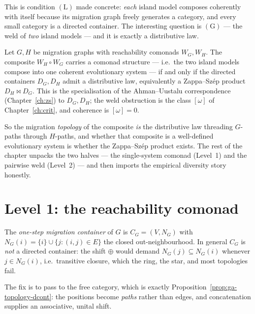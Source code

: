 This is condition $(\mathrm{L})$ made concrete: \emph{each} island model
composes coherently with itself because its migration graph freely generates a
category, and every small category is a directed container. The interesting
question is $(\mathrm{G})$ --- the weld of \emph{two} island models --- and it
is exactly a distributive law.

\begin{theorem}[Coherence $=$ Zappa--Sz\'ep existence; \emph{proved}]
\label{thm:ga-headline}
Let $G,H$ be migration graphs with reachability comonads $W_G,W_H$. The
composite $W_H\circ W_G$ carries a comonad structure --- i.e.\ the two island
models compose into one coherent evolutionary system --- if and only if the
directed containers $D_G,D_H$ admit a distributive law, equivalently a
Zappa--Sz\'ep product $D_H\bowtie D_G$. This is the specialisation of the
Ahman--Uustalu correspondence (Chapter~\ref{ch:zs}) to $D_G,D_H$; the weld
obstruction is the class $[\omega]$ of Chapter~\ref{ch:crit}, and coherence is
$[\omega]=0$.
\end{theorem}

So the migration \emph{topology} of the composite \emph{is} the distributive law
threading $G$-paths through $H$-paths, and whether that composite is a
well-defined evolutionary system is whether the Zappa--Sz\'ep product exists. The
rest of the chapter unpacks the two halves --- the single-system comonad
(Level~1) and the pairwise weld (Level~2) --- and then imports the empirical
diversity story honestly.

\section{Level 1: the reachability comonad}
\label{sec:ga-level1}

\begin{definition}
\label{def:ga-mig-container}
The \emph{one-step migration container} of $G$ is $C_G=(V,N_G)$ with
$N_G(i)=\{i\}\cup\{j:(i,j)\in E\}$ the closed out-neighbourhood. In general
$C_G$ is \emph{not} a directed container: the shift $\oplus$ would demand
$N_G(j)\subseteq N_G(i)$ whenever $j\in N_G(i)$, i.e.\ transitive closure, which
the ring, the star, and most topologies fail.
\end{definition}

The fix is to pass to the free category, which is exactly
Proposition~\ref{prop:ga-topology-dcont}: the positions become \emph{paths}
rather than edges, and concatenation supplies an associative, unital shift.

